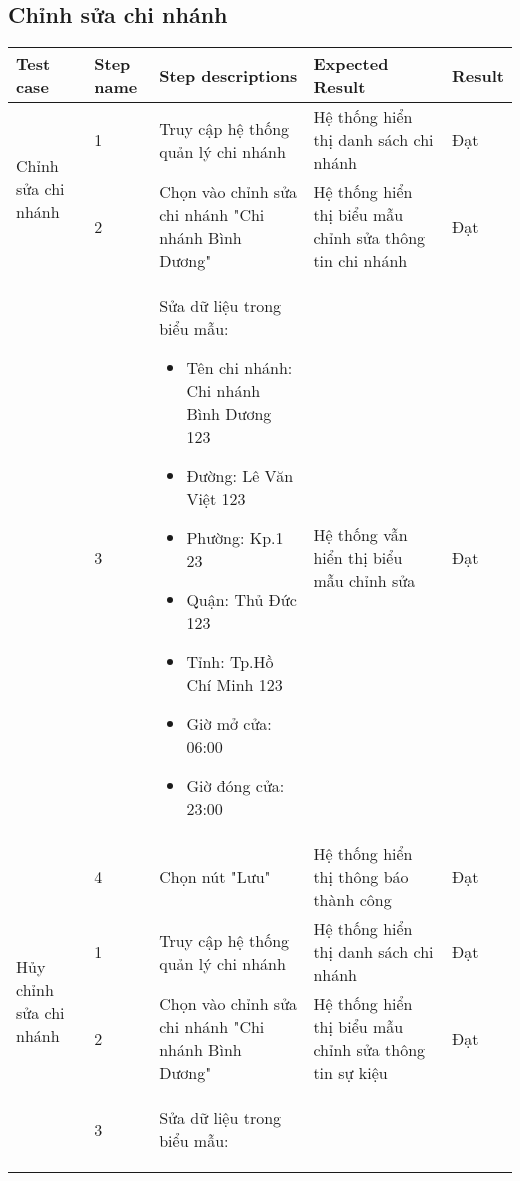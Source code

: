 \subsection{Chỉnh sửa chi nhánh}
{
    \setlength\extrarowheight{6pt}
    \begin{longtable}{| p{2.5cm}| p{1cm}| p{5.5cm}| p{4.5cm} | p{1.5cm} |}
        \hline
        \textbf{Test case} & \textbf{Step name} & \textbf{Step descriptions} & \textbf{Expected Result} & \textbf{Result} \\
        \hline
        \multirow[t]{2}{2.5cm}{Chỉnh sửa chi nhánh} & 1 & Truy cập hệ thống quản lý chi nhánh & Hệ thống hiển thị danh sách chi nhánh & Đạt \\
        \cline{2-5}
         & 2 & Chọn vào chỉnh sửa chi nhánh "Chi nhánh Bình Dương" & Hệ thống hiển thị biểu mẫu chỉnh sửa thông tin chi nhánh& Đạt \\
        \cline{2-5}
        & 3 & Sửa dữ liệu trong biểu mẫu:
        \begin{itemize}
            \item Tên chi nhánh: Chi nhánh Bình Dương 123
            \item Đường: Lê Văn Việt 123
            \item Phường: Kp.1 23
            \item Quận: Thủ Đức 123
            \item Tỉnh: Tp.Hồ Chí Minh 123
            \item Giờ mở cửa: 06:00
            \item Giờ đóng cửa: 23:00 
        \end{itemize} & Hệ thống vẫn hiển thị biểu mẫu chỉnh sửa & Đạt \\
        \cline{2-5}
         & 4 & Chọn nút "Lưu" & Hệ thống hiển thị thông báo thành công & Đạt \\
        \hline
        \multirow[t]{2}{2.5cm}{Hủy chỉnh sửa chi nhánh} & 1 & Truy cập hệ thống quản lý chi nhánh & Hệ thống hiển thị danh sách chi nhánh & Đạt \\
        \cline{2-5}
         & 2 & Chọn vào chỉnh sửa chi nhánh "Chi nhánh Bình Dương" & Hệ thống hiển thị biểu mẫu chỉnh sửa thông tin sự kiệu & Đạt \\
        \cline{2-5}
        & 3 & Sửa dữ liệu trong biểu mẫu:
        \begin{itemize}

\end{itemize}
\end{longtable}}
